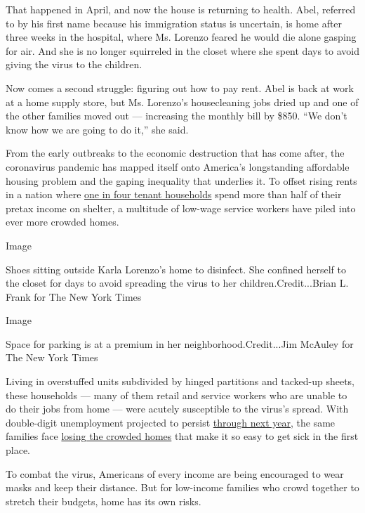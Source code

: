 That happened in April, and now the house is returning to health. Abel,
referred to by his first name because his immigration status is
uncertain, is home after three weeks in the hospital, where Ms. Lorenzo
feared he would die alone gasping for air. And she is no longer
squirreled in the closet where she spent days to avoid giving the virus
to the children.

Now comes a second struggle: figuring out how to pay rent. Abel is back
at work at a home supply store, but Ms. Lorenzo's housecleaning jobs
dried up and one of the other families moved out --- increasing the
monthly bill by \$850. ``We don't know how we are going to do it,'' she
said.

From the early outbreaks to the economic destruction that has come
after, the coronavirus pandemic has mapped itself onto America's
longstanding affordable housing problem and the gaping inequality that
underlies it. To offset rising rents in a nation where
\href{https://www.jchs.harvard.edu/sites/default/files/Harvard_JCHS_Americas_Rental_Housing_2020.pdf}{one
in four tenant households} spend more than half of their pretax income
on shelter, a multitude of low-wage service workers have piled into ever
more crowded homes.

Image

Shoes sitting outside Karla Lorenzo's home to disinfect. She confined
herself to the closet for days to avoid spreading the virus to her
children.Credit...Brian L. Frank for The New York Times

Image

Space for parking is at a premium in her neighborhood.Credit...Jim
McAuley for The New York Times

Living in overstuffed units subdivided by hinged partitions and
tacked-up sheets, these households --- many of them retail and service
workers who are unable to do their jobs from home --- were acutely
susceptible to the virus's spread. With double-digit unemployment
projected to persist
\href{https://www.nytimes.com/2020/07/15/business/economy/economic-recovery-coronavirus-resurgence.html}{through
next year}, the same families face
\href{https://www.nytimes.com/2020/05/27/us/coronavirus-evictions-renters.html}{losing
the crowded homes} that make it so easy to get sick in the first place.

To combat the virus, Americans of every income are being encouraged to
wear masks and keep their distance. But for low-income families who
crowd together to stretch their budgets, home has its own risks.

